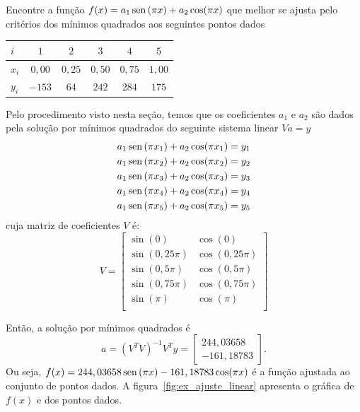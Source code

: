 \begin{ex}\label{ex:ajuste_linear} Encontre a função $f(x)=a_1\operatorname{sen}\,(\pi x) + a_2\cos(\pi x)$ que melhor se ajusta pelo critérios dos mínimos quadrados aos seguintes pontos dados
  \begin{center}
    \begin{tabular}{l|ccccc}
      $i$ & $1$  & $2$ & $3$ & $4$ & $5$\\\hline
      $x_i$ & $0,00$ & $0,25$ & $0,50$ & $0,75$ & $1,00$\\
      $y_i$ & $-153$ & $64$ & $242$ & $284$ & $175$
    \end{tabular}
  \end{center} 
\end{ex}
\begin{sol}
Pelo procedimento visto nesta seção, temos que os coeficientes $a_1$ e $a_2$ são dados pela solução por mínimos quadrados do seguinte sistema linear $Va = y$
\begin{equation*}
  \begin{split}
    a_1\operatorname{sen}\,(\pi x_1) + a_2\cos(\pi x_1) &= y_1\\
    a_1\operatorname{sen}\,(\pi x_2) + a_2\cos(\pi x_2) &= y_2\\
    a_1\operatorname{sen}\,(\pi x_3) + a_2\cos(\pi x_3) &= y_3\\
    a_1\operatorname{sen}\,(\pi x_4) + a_2\cos(\pi x_4) &= y_4\\
    a_1\operatorname{sen}\,(\pi x_5) + a_2\cos(\pi x_5) &= y_5
  \end{split}
\end{equation*}
cuja matriz de coeficientes $V$ é:
\begin{equation*}
  V=\begin{bmatrix}
    \sin(0) & \cos(0)  \\
    \sin(0,25\pi) & \cos(0,25\pi)  \\
    \sin(0,5\pi) & \cos(0,5\pi)  \\
    \sin(0,75\pi) & \cos(0,75\pi)  \\
    \sin(\pi) & \cos(\pi)  \\
 \end{bmatrix}
\end{equation*}

Então, a solução por mínimos quadrados é
\begin{equation*}
  a = (V^TV)^{-1}V^Ty =
  \begin{bmatrix}
    244,03658\\
    -161,18783
  \end{bmatrix}.
\end{equation*}
Ou seja, $f(x) = 244,03658\operatorname{sen}\,(\pi x) - 161,18783\cos(\pi x)$ é a função ajustada ao conjunto de pontos dados. A figura~\ref{fig:ex_ajuste_linear} apresenta o gráfica de $f(x)$ e dos pontos dados.


\end{sol}
